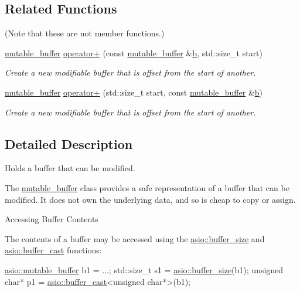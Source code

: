 \subsection*{Related Functions}
(Note that these are not member functions.) \begin{DoxyCompactItemize}
\item 
\hyperlink{classasio_1_1mutable__buffer}{mutable\+\_\+buffer} \hyperlink{classasio_1_1mutable__buffer_a4950f4389232461552edf52410d4216f}{operator+} (const \hyperlink{classasio_1_1mutable__buffer}{mutable\+\_\+buffer} \&\hyperlink{group__async__read_ga945a5c18fa77a9e2eba420f8f44b2a4f}{b}, std\+::size\+\_\+t start)
\begin{DoxyCompactList}\small\item\em Create a new modifiable buffer that is offset from the start of another. \end{DoxyCompactList}\item 
\hyperlink{classasio_1_1mutable__buffer}{mutable\+\_\+buffer} \hyperlink{classasio_1_1mutable__buffer_a33017b213bb2f2263540eb32fcac3bfb}{operator+} (std\+::size\+\_\+t start, const \hyperlink{classasio_1_1mutable__buffer}{mutable\+\_\+buffer} \&\hyperlink{group__async__read_ga945a5c18fa77a9e2eba420f8f44b2a4f}{b})
\begin{DoxyCompactList}\small\item\em Create a new modifiable buffer that is offset from the start of another. \end{DoxyCompactList}\end{DoxyCompactItemize}


\subsection{Detailed Description}
Holds a buffer that can be modified. 

The \hyperlink{classasio_1_1mutable__buffer}{mutable\+\_\+buffer} class provides a safe representation of a buffer that can be modified. It does not own the underlying data, and so is cheap to copy or assign.

\begin{DoxyParagraph}{Accessing Buffer Contents}

\end{DoxyParagraph}
The contents of a buffer may be accessed using the \hyperlink{group__buffer__size}{asio\+::buffer\+\_\+size} and \hyperlink{group__buffer__cast}{asio\+::buffer\+\_\+cast} functions\+:


\begin{DoxyCode}
 \hyperlink{classasio_1_1mutable__buffer}{asio::mutable\_buffer} b1 = ...;
std::size\_t s1 = \hyperlink{group__buffer__size_gabe8b5f116fbb66004b6d0ba8ee39c3d5}{asio::buffer\_size}(b1);
\textcolor{keywordtype}{unsigned} \textcolor{keywordtype}{char}* p1 = \hyperlink{group__buffer__cast_ga6faa5f9daa2512cc9c3cefa8b5ab0704}{asio::buffer\_cast}<\textcolor{keywordtype}{unsigned} \textcolor{keywordtype}{char}*>(b1);
\end{DoxyCode}


